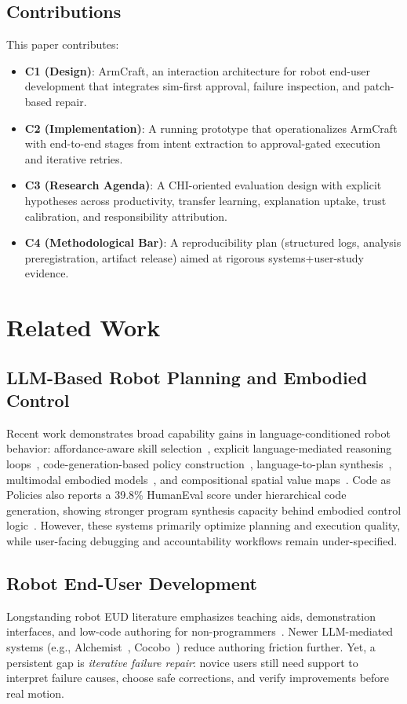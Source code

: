 \documentclass[sigconf,review,anonymous]{acmart}
\begin{document}
\subsection{Contributions}
This paper contributes:
\begin{itemize}
  \item \textbf{C1 (Design)}: ArmCraft, an interaction architecture for robot end-user development that integrates sim-first approval, failure inspection, and patch-based repair.
  \item \textbf{C2 (Implementation)}: A running prototype that operationalizes ArmCraft with end-to-end stages from intent extraction to approval-gated execution and iterative retries.
  \item \textbf{C3 (Research Agenda)}: A CHI-oriented evaluation design with explicit hypotheses across productivity, transfer learning, explanation uptake, trust calibration, and responsibility attribution.
  \item \textbf{C4 (Methodological Bar)}: A reproducibility plan (structured logs, analysis preregistration, artifact release) aimed at rigorous systems+user-study evidence.
\end{itemize}

\section{Related Work}
\subsection{LLM-Based Robot Planning and Embodied Control}
Recent work demonstrates broad capability gains in language-conditioned robot behavior: affordance-aware skill selection~\cite{ahn2022saycan}, explicit language-mediated reasoning loops~\cite{huang2022innermonologue}, code-generation-based policy construction~\cite{liang2023codeaspolicies}, language-to-plan synthesis~\cite{singh2022progprompt}, multimodal embodied models~\cite{driess2023palme,brohan2023rt2}, and compositional spatial value maps~\cite{huang2023voxposer}. Code as Policies also reports a 39.8\% HumanEval score under hierarchical code generation, showing stronger program synthesis capacity behind embodied control logic~\cite{liang2023codeaspolicies}. However, these systems primarily optimize planning and execution quality, while user-facing debugging and accountability workflows remain under-specified.

\subsection{Robot End-User Development}
Longstanding robot EUD literature emphasizes teaching aids, demonstration interfaces, and low-code authoring for non-programmers~\cite{alexandrova2014pbd,ajaykumar2021kinesthetic,fogli2022hybrid}. Newer LLM-mediated systems (e.g., Alchemist~\cite{karli2024alchemist}, Cocobo~\cite{ge2024cocobo}) reduce authoring friction further. Yet, a persistent gap is \emph{iterative failure repair}: novice users still need support to interpret failure causes, choose safe corrections, and verify improvements before real motion.
\end{document}
